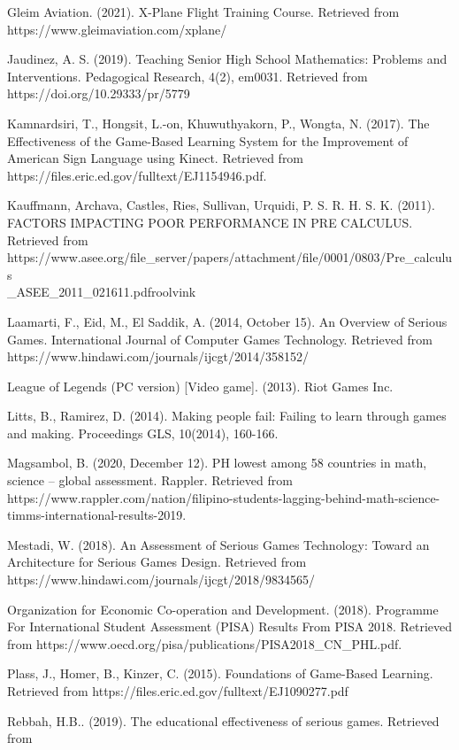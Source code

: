 \begin{adjustwidth}{0.1in}{0.1in}
Gleim Aviation. (2021). X-Plane Flight Training Course. Retrieved from https://www.gleimaviation.com/xplane/

Jaudinez, A. S. (2019). Teaching Senior High School Mathematics: Problems and Interventions. Pedagogical Research, 4(2), em0031. Retrieved from 
https://doi.org/10.29333/pr/5779

Kamnardsiri, T., Hongsit, L.-on, Khuwuthyakorn, P., Wongta, N. (2017). The Effectiveness of the Game-Based Learning System for the Improvement of American Sign Language using Kinect. Retrieved from https://files.eric.ed.gov/fulltext/EJ1154946.pdf. 

Kauffmann, Archava, Castles, Ries, Sullivan, Urquidi, P. S. R. H. S. K. (2011). FACTORS IMPACTING POOR PERFORMANCE IN PRE CALCULUS. Retrieved from https://www.asee.org/file\_server/papers/attachment/file/0001/0803/Pre\_calculus \\ \_ASEE\_2011\_021611.pdfroolvink

Laamarti, F., Eid, M., El Saddik, A. (2014, October 15). An Overview of Serious Games. International Journal of Computer Games Technology. Retrieved from https://www.hindawi.com/journals/ijcgt/2014/358152/

League of Legends (PC version) [Video game]. (2013). Riot Games Inc.

Litts, B., Ramirez, D. (2014). Making people fail: Failing to learn through games and making. Proceedings GLS, 10(2014), 160-166.

Magsambol, B. (2020, December 12). PH lowest among 58 countries in math, science – global assessment. Rappler. Retrieved from https://www.rappler.com/nation/filipino-students-lagging-behind-math-science-timms-international-results-2019. 

Mestadi, W. (2018). An Assessment of Serious Games Technology: Toward an Architecture for Serious Games Design. Retrieved from https://www.hindawi.com/journals/ijcgt/2018/9834565/

Organization for Economic Co-operation and Development. (2018). Programme For International Student Assessment (PISA) Results From PISA 2018. Retrieved from https://www.oecd.org/pisa/publications/PISA2018\_CN\_PHL.pdf.

Plass, J., Homer, B., Kinzer, C. (2015). Foundations of Game-Based Learning. Retrieved from https://files.eric.ed.gov/fulltext/EJ1090277.pdf

Rebbah, H.B.. (2019). The educational effectiveness of serious games. Retrieved from 


\end{adjustwidth}
